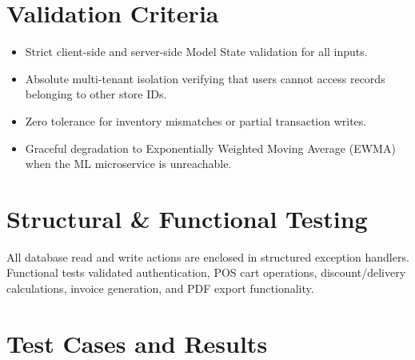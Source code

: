 \documentclass[12pt,a4paper]{report}
\begin{document}
\section{Validation Criteria}
\begin{itemize}
    \item Strict client-side and server-side Model State validation for all inputs.
    \item Absolute multi-tenant isolation verifying that users cannot access records belonging to other store IDs.
    \item Zero tolerance for inventory mismatches or partial transaction writes.
    \item Graceful degradation to Exponentially Weighted Moving Average (EWMA) when the ML microservice is unreachable.
\end{itemize}

\section{Structural \& Functional Testing}
All database read and write actions are enclosed in structured exception handlers. Functional tests validated authentication, POS cart operations, discount/delivery calculations, invoice generation, and PDF export functionality.

\section{Test Cases and Results}
\end{document}
